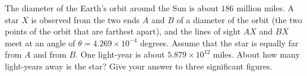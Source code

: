 The diameter of the Earth's orbit around the Sun is about $186$ million miles. A star $X$ is observed from the two ends $A$ and $B$ of a diameter of the orbit (the two points of the orbit that are farthest apart), and the lines of sight $AX$ and $BX$ meet at an angle of $\theta=4.269\times10^{-4}$ degrees. Assume that the star is equally far from $A$ and from $B$. One light-year is about $5.879\times10^{12}$ miles. About how many light-years away is the star? Give your answer to three significant figures.
